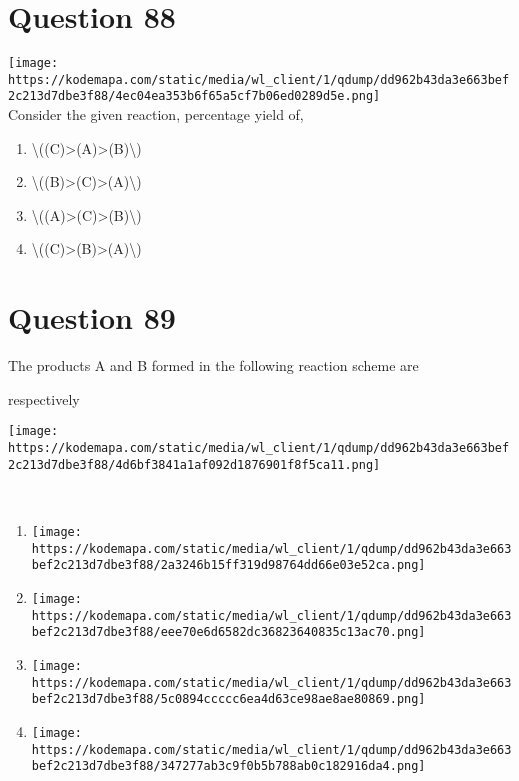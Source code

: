 \documentclass{article}
\begin{document}
\section*{Question 88}
\texttt{[image: https://kodemapa.com/static/media/wl\_client/1/qdump/dd962b43da3e663bef2c213d7dbe3f88/4ec04ea353b6f65a5cf7b06ed0289d5e.png]}\\



Consider the given reaction, percentage yield of,~


\begin{enumerate}[label=(\alph*)]
\item \textbackslash((C)\textgreater(A)\textgreater(B)\textbackslash)


\item \textbackslash((B)\textgreater(C)\textgreater(A)\textbackslash)


\item \textbackslash((A)\textgreater(C)\textgreater(B)\textbackslash)


\item \textbackslash((C)\textgreater(B)\textgreater(A)\textbackslash)


\end{enumerate}
\newpage
\section*{Question 89}
The products A and B formed in the following reaction scheme are

respectively



\texttt{[image: https://kodemapa.com/static/media/wl\_client/1/qdump/dd962b43da3e663bef2c213d7dbe3f88/4d6bf3841a1af092d1876901f8f5ca11.png]}\\



{}\strut \\


\begin{enumerate}[label=(\alph*)]
\item \texttt{[image: https://kodemapa.com/static/media/wl\_client/1/qdump/dd962b43da3e663bef2c213d7dbe3f88/2a3246b15ff319d98764dd66e03e52ca.png]}


\item \texttt{[image: https://kodemapa.com/static/media/wl\_client/1/qdump/dd962b43da3e663bef2c213d7dbe3f88/eee70e6d6582dc36823640835c13ac70.png]}


\item \texttt{[image: https://kodemapa.com/static/media/wl\_client/1/qdump/dd962b43da3e663bef2c213d7dbe3f88/5c0894ccccc6ea4d63ce98ae8ae80869.png]}


\item \texttt{[image: https://kodemapa.com/static/media/wl\_client/1/qdump/dd962b43da3e663bef2c213d7dbe3f88/347277ab3c9f0b5b788ab0c182916da4.png]}


\end{enumerate}
\newpage
\end{document}
